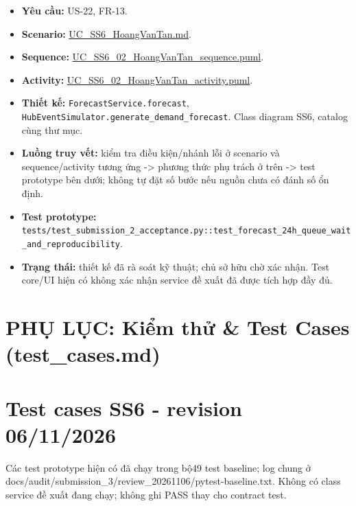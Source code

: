 \documentclass[11pt,a4paper]{article}
\providecommand{\tightlist}{%
  \setlength{\itemsep}{0pt}\setlength{\parskip}{0pt}}
\begin{document}
\begin{itemize}
\tightlist
\item
  \textbf{Yêu cầu:} US-22, FR-13.
\item
  \textbf{Scenario:}
  \href{../../../../docs/diagrams/Use-case\%20detail-scenario/SS6/Usecase\%20scenario/UC_SS6_HoangVanTan.md}{UC\_SS6\_HoangVanTan.md}.
\item
  \textbf{Sequence:}
  \href{../../../../docs/diagrams/Use-case\%20detail-scenario/SS6/Sequence\%20diagrams/UC_SS6_02_HoangVanTan_sequence.puml}{UC\_SS6\_02\_HoangVanTan\_sequence.puml}.
\item
  \textbf{Activity:}
  \href{../../../../docs/diagrams/Use-case\%20detail-scenario/SS6/Activity\%20diagrams/UC_SS6_02_HoangVanTan_activity.puml}{UC\_SS6\_02\_HoangVanTan\_activity.puml}.
\item
  \textbf{Thiết kế:} \texttt{ForecastService.forecast},
  \texttt{HubEventSimulator.generate\_demand\_forecast}. Class diagram
  SS6, catalog cùng thư mục.
\item
  \textbf{Luồng truy vết:} kiểm tra điều kiện/nhánh lỗi ở scenario và
  sequence/activity tương ứng -\textgreater{} phương thức phụ trách ở
  trên -\textgreater{} test prototype bên dưới; không tự đặt số bước nếu
  nguồn chưa có đánh số ổn định.
\item
  \textbf{Test prototype:}
  \texttt{tests/test\_submission\_2\_acceptance.py::test\_forecast\_24h\_queue\_wait\_and\_reproducibility}.
\item
  \textbf{Trạng thái:} thiết kế đã rà soát kỹ thuật; chủ sở hữu chờ xác
  nhận. Test core/UI hiện có không xác nhận service đề xuất đã được tích
  hợp đầy đủ.
\end{itemize}

\newpage
\section*{PHỤ LỤC: Kiểm thử \& Test Cases (test\_cases.md)}
\hypertarget{test-cases-ss6---revision-06112026}{%
\section{Test cases SS6 - revision
06/11/2026}\label{test-cases-ss6---revision-06112026}}

Các test prototype hiện có đã chạy trong bộ49 test baseline; log chung ở
docs/audit/submission\_3/review\_20261106/pytest-baseline.txt. Không có
class service đề xuất đang chạy; không ghi PASS thay cho contract test.
\end{document}
